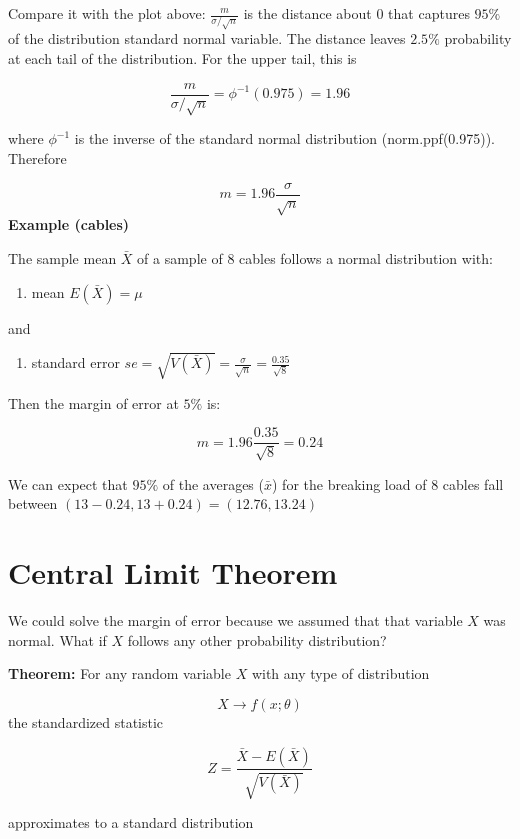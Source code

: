 \documentclass[
]{book}
\providecommand{\tightlist}{%
  \setlength{\itemsep}{0pt}\setlength{\parskip}{0pt}}
\begin{document}
Compare it with the plot above: \(\frac{m}{\sigma/\sqrt{n}}\) is the distance about \(0\) that captures \(95\%\) of the distribution standard normal variable. The distance leaves \(2.5\%\) probability at each tail of the distribution. For the upper tail, this is

\[\frac{m}{\sigma/\sqrt{n}}=\phi^{-1}(0.975)=1.96\]

where \(\phi^{-1}\) is the inverse of the standard normal distribution (norm.ppf(0.975)). Therefore

\[m=1.96 \frac{\sigma}{\sqrt{n}}\]
\textbf{Example (cables)}

The sample mean \(\bar{X}\) of a sample of \(8\) cables follows a normal distribution with:

\begin{enumerate}
\def\labelenumi{\arabic{enumi}.}
\tightlist
\item
  mean \(E(\bar{X})=\mu\)
\end{enumerate}

and

\begin{enumerate}
\def\labelenumi{\arabic{enumi}.}
\setcounter{enumi}{1}
\tightlist
\item
  standard error \(se=\sqrt{V(\bar{X})}=\frac{\sigma}{\sqrt{n}}=\frac{0.35}{\sqrt{8}}\)
\end{enumerate}

Then the margin of error at \(5\%\) is:

\[m=1.96\frac{0.35}{\sqrt{8}}=0.24\]

We can expect that \(95\%\) of the averages (\(\bar{x}\)) for the breaking load of \(8\) cables fall between \((13-0.24, 13+0.24)=(12.76, 13.24)\)

\hypertarget{central-limit-theorem-1}{%
\section{Central Limit Theorem}\label{central-limit-theorem-1}}

We could solve the margin of error because we assumed that that variable \(X\) was normal. What if \(X\) follows any other probability distribution?

\textbf{Theorem:} For any random variable \(X\) with any type of distribution

\[X \rightarrow f(x; \theta)\]
the standardized statistic

\[Z=\frac{\bar{X}-E(\bar{X})}{\sqrt{V(\bar{X})}}\]

approximates to a standard distribution
\end{document}
